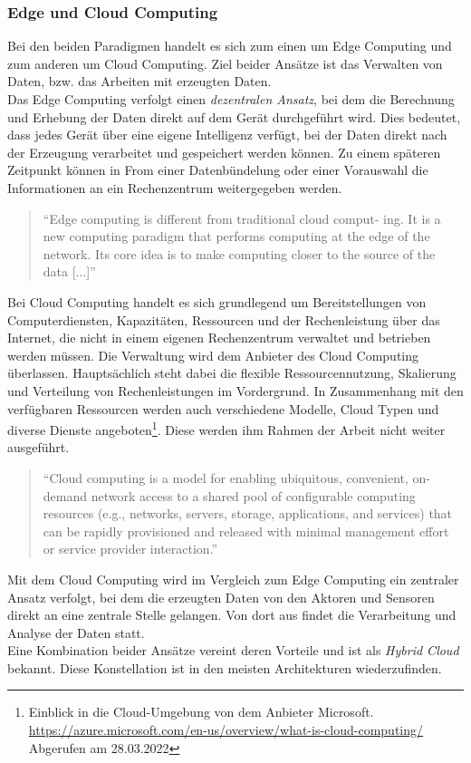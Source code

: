         \subsubsection*{Edge und Cloud Computing}
            Bei den beiden Paradigmen handelt es sich zum einen um Edge Computing und zum anderen um Cloud Computing. Ziel beider Ansätze ist das 
            Verwalten von Daten, bzw. das Arbeiten mit erzeugten Daten.
            \\
            Das Edge Computing verfolgt einen \textit{dezentralen Ansatz}, bei dem die Berechnung und Erhebung der Daten direkt auf dem Gerät durchgeführt wird. %
            Dies bedeutet, dass jedes Gerät über eine eigene Intelligenz verfügt, bei der Daten direkt nach der Erzeugung verarbeitet und gespeichert werden können. 
            Zu einem späteren Zeitpunkt können in From einer Datenbündelung oder einer Vorauswahl die Informationen an ein Rechenzentrum weitergegeben werden. 
            \begin{quote}
                “Edge computing is different from traditional cloud comput- ing. It is a new computing paradigm that performs computing at the edge 
                of the network. Its core idea is to make computing closer to the source of the data [...]” \cite{Cao2020}
            \end{quote}
            Bei Cloud Computing handelt es sich grundlegend um Bereitstellungen von Computerdiensten, Kapazitäten, Ressourcen und der Rechenleistung über 
            das Internet, die nicht in einem eigenen Rechenzentrum 
            verwaltet und betrieben werden müssen. Die Verwaltung wird dem Anbieter des Cloud Computing überlassen. Hauptsächlich steht dabei die 
            flexible Ressourcennutzung, Skalierung und Verteilung von Rechenleistungen im Vordergrund. In Zusammenhang mit den verfügbaren Ressourcen 
            werden auch verschiedene Modelle, Cloud Typen und diverse Dienste angeboten\footnote{Einblick in die Cloud-Umgebung von dem Anbieter Microsoft. \url{https://azure.microsoft.com/en-us/overview/what-is-cloud-computing/} Abgerufen am 28.03.2022}. 
            Diese werden ihm Rahmen der Arbeit nicht weiter ausgeführt.
            \begin{quote}
                “Cloud computing is a model for enabling ubiquitous, convenient, on-demand network access to a shared pool of configurable 
                computing resources (e.g., networks, servers, storage, applications, and services) that can be rapidly provisioned and 
                released with minimal management effort or service provider interaction.” \cite{Mell2011}
            \end{quote}
            Mit dem Cloud Computing wird im Vergleich zum Edge Computing ein zentraler Ansatz verfolgt, bei dem die erzeugten Daten von den Aktoren und 
            Sensoren direkt an eine zentrale Stelle gelangen. Von dort aus findet die Verarbeitung und Analyse der Daten statt. 
            \\
            Eine Kombination beider Ansätze vereint deren Vorteile und ist als \textit{Hybrid Cloud} bekannt. Diese Konstellation ist in den meisten 
            Architekturen wiederzufinden. 
    
